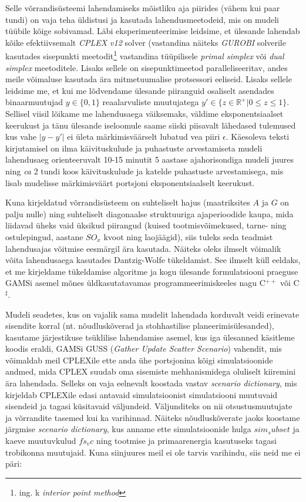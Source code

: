 \documentclass[10pt,a4paper]{article}
\begin{document}
Selle võrrandisüsteemi lahendamiseks mõistliku aja piirides (vähem kui paar tundi) on vaja teha üldistusi ja kasutada lahendusmeetodeid, mis on mudeli tüübile kõige sobivamad. Läbi eksperimenteerimise leidsime, et ülesande lahendab kõike efektiivsemalt \emph{CPLEX v12} solver (vastandina näiteks \emph{GUROBI} solverile kasutades sisepunkti meetodit\footnote{ing. k \emph{interior point method}} vastandina tüüpilisele \emph{primal simplex} või \emph{dual simplex} meetoditele\cite{Hillier1995}. Lisaks sellele on sisepunktimeetod paralleliseeritav, andes meile võimaluse kasutada ära mitmetuumalise protsessori eeliseid. Lisaks sellele leidsime me, et kui me lõdvendame ülesande piiranguid osaliselt asendades binaarmuutujad $y \in \{0,1\}$ reaalarvuliste muutujatega $y' \in \{z\in \mathbb{R^+} | 0 \leq z \leq 1\}$. Sellisel viisil lõikame me lahendusaega väiksemaks, väldime eksponentsiaalset keerukust ja tänu ülesande iseloomule saame siiski piisavalt lähedased tulemused kus vahe $|y-y'|$ ei ületa märkimisväärselt lubatud vea piiri $\epsilon$. Käesoleva teksti kirjutamisel on ilma käivituskulude ja puhastuste arvestamiseta mudeli lahendusaeg orienteeruvalt 10-15 minutit 5 aastase ajahorisondiga mudeli juures ning \emph{ca} 2 tundi koos käivituskulude ja katelde puhastuste arvestamisega, mis lisab mudelisse märkimisväärt portsjoni eksponentsiaalselt keerukust.

Kuna kirjeldatud võrrandisüsteem on suhteliselt hajus (maatriksites $A$ ja $G$ on palju nulle) ning suhteliselt diagonaalse struktuuriga ajaperioodide kaupa, mida liidavad üheks vaid üksikud piirangud (kuised tootmisvõimekused, tarne- ning ostulepingud, aastane $SO_x$ kvoot ning laojäägid), siis tuleks seda teadmist lahendusajas võitmise eesmärgil ära kasutada. Näiteks oleks ilmselt võimalik võita lahendusaega kasutades Dantzig-Wolfe tükeldamist. See ilmselt küll eeldaks, et me kirjeldame tükeldamise algoritme ja kogu ülesande formulatsiooni praeguse GAMSi asemel mõnes üldkasutatavamas programmeerimiskeeles nagu C$^{++}$ või C$^\sharp$.

Mudeli seadetes, kus on vajalik sama mudelit lahendada korduvalt veidi erinevate sisendite korral (nt. nõudluskõverad ja stohhastilise planeerimisülesanded), kasutame järjestikuse tsüklilise lahendamise asemel, kus iga ülesanned käsitleme koodis eraldi, GAMSi GUSS (\emph{Gather Update Scatter Scenario}) vahendit, mis võimaldab meil CPLEXile ette anda ühe portsjonina kõigi simulatsioonide andmed, mida CPLEX suudab oma sisemiste mehhanismidega oluliselt kiiremini ära lahendada. Selleks on vaja eelnevalt koostada vastav \emph{scenario dictionary}, mis kirjeldab CPLEXile edasi antavaid simulatsioonist simulatsiooni muutuvaid sisendeid ja tagasi küsitavaid väljundeid. Väljunditeks on nii otsustusmuutujate ja võrrandite tasemed kui ka varihinnad. Näiteks nõudluskõverate jaoks koostame järgmise \emph{scenario dictionary}, kus anname ette simulatsioonide hulga $sim_subset$ ja kaeve muutuvkulud $fs_vc$ ning tootmise ja primaarenergia kasutuseks tagasi trobikonna muutujaid. Kuna siinjuures meil ei ole tarvis varihindu, siis neid me ei päri:
\end{document}

